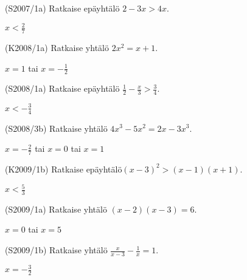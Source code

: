 \begin{tehtava}
(S2007/1a) Ratkaise epäyhtälö $2-3x>4x$.
\begin{vastaus}
$x< \frac{2}{7} $
\end{vastaus}
\end{tehtava}

\begin{tehtava}
(K2008/1a) Ratkaise yhtälö $2x^2=x+1$.
\begin{vastaus}
$x=1$ tai $x=-\frac{1}{2}$
\end{vastaus}
\end{tehtava}

\begin{tehtava}
(S2008/1a) Ratkaise epäyhtälö $\frac{1}{2} - \frac{x}{3} > \frac{3}{4}$.
\begin{vastaus}
$x<-\frac{3}{4}$
\end{vastaus}
\end{tehtava}


\begin{tehtava}
(S2008/3b) Ratkaise yhtälö $4x^3-5x^2=2x-3x^3$.
\begin{vastaus}
$x=-\frac{2}{7}$ tai $x=0$ tai $x=1$
\end{vastaus}
\end{tehtava}

\begin{tehtava}
(K2009/1b) Ratkaise epäyhtälö$(x-3)^2>(x-1)(x+1)$.
\begin{vastaus}
$x<\frac{5}{3}$
\end{vastaus}
\end{tehtava}

\begin{tehtava}
(S2009/1a) Ratkaise yhtälö $(x-2)(x-3)=6$. 
\begin{vastaus}
$x=0$ tai $x=5$
\end{vastaus}
\end{tehtava}

\begin{tehtava}
(S2009/1b) Ratkaise yhtälö $\frac{x}{x-3}-\frac{1}{x}=1$.
\begin{vastaus}
$x=-\frac{3}{2}$
\end{vastaus}
\end{tehtava}

